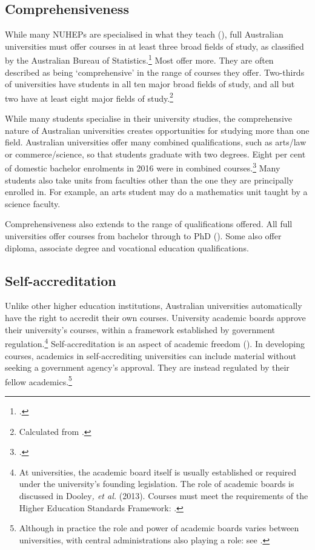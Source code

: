 \documentclass{grattan}
\begin{document}
%
\subsection{Comprehensiveness}\label{subsec:comprehensiveness}

While many NUHEPs are specialised in what they teach (), full Australian universities must offer courses in at least three broad fields of study, as classified by the Australian Bureau of Statistics.\footcite[][]{ABS2001australianstandard} Most offer more. They are often described as being `comprehensive' in the range of courses they offer. Two-thirds of universities have students in all ten major broad fields of study, and all but two have at least eight major fields of study.\footnote{Calculated from \textcite[][]{DepartmentofEducationandTraining2018ucubehighereduc}.}

While many students specialise in their university studies, the comprehensive nature of Australian universities creates opportunities for studying more than one field. Australian universities offer many combined qualifications, such as arts/law or commerce/science, so that students graduate with two degrees. Eight per cent of domestic bachelor enrolments in 2016 were in combined courses.\footcite[][]{DepartmentofEducationandTraining2017resarchblockgrant} Many students also take units from faculties other than the one they are principally enrolled in. For example, an arts student may do a mathematics unit taught by a science faculty.

Comprehensiveness also extends to the range of qualifications offered. All full universities offer courses from bachelor through to PhD (). Some also offer diploma, associate degree and vocational education qualifications.

%
\subsection{Self-accreditation}\label{subsec:self-accreditation}

Unlike other higher education institutions, Australian universities automatically have the right to accredit their own courses. University academic boards approve their university's courses, within a framework established by government regulation.\footnote{At universities, the academic board itself is usually established or required under the university's founding legislation. The role of academic boards is discussed in Dooley\emph{, et al.} (2013). Courses must meet the requirements of the Higher Education Standards Framework: \textcite[][]{DepartmentofEducationandTraining2015highereducationre}.} Self-accreditation is an aspect of academic freedom (). In developing courses, academics in self-accrediting universities can include material without seeking a government agency's approval. They are instead regulated by their fellow academics.\footnote{Although in practice the role and power of academic boards varies between universities, with central administrations also playing a role: see \textcite[][]{Rowlands2017academicgovernance}.}
\end{document}
